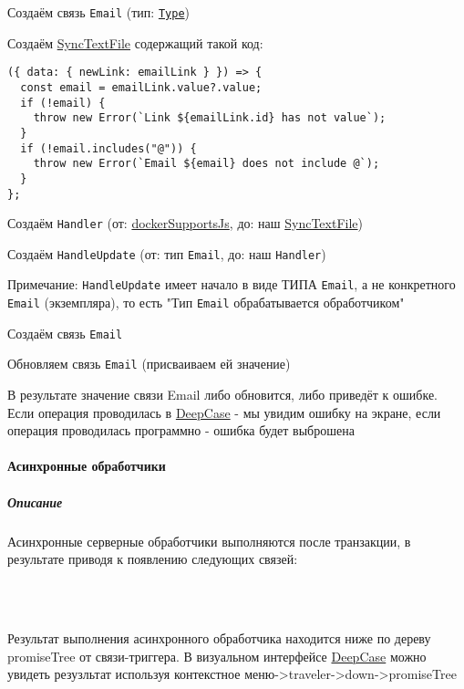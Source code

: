 \documentclass{article}
\begin{document}
Создаём связь \texttt{Email} (тип: \texttt{\hyperlink{Core.Type.Description}{Type}})

Создаём \hyperlink{Core.SyncTextFile.Description}{SyncTextFile} содержащий такой код:

\begin{lstlisting}
({ data: { newLink: emailLink } }) => {
  const email = emailLink.value?.value;
  if (!email) {
    throw new Error(`Link ${emailLink.id} has not value`);
  }
  if (!email.includes("@")) {
    throw new Error(`Email ${email} does not include @`);
  }
};
\end{lstlisting}

Создаём \texttt{Handler} (от:
\hyperlink{Core.dockerSupportsJs.Description}{dockerSupportsJs}, до: наш
\hyperlink{Core.SyncTextFile.Description}{SyncTextFile})

Создаём \texttt{HandleUpdate} (от: тип \texttt{Email}, до: наш
\texttt{Handler})

Примечание: \texttt{HandleUpdate} имеет начало в виде ТИПА \texttt{Email}, а
не конкретного \texttt{Email} (экземпляра), то есть "Тип \texttt{Email}
обрабатывается обработчиком"

Создаём связь \texttt{Email}

Обновляем связь \texttt{Email} (присваиваем ей значение)

В результате значение связи Email либо обновится, либо приведёт к ошибке.
Если операция проводилась в \hyperlink{DeepCase.Description}{DeepCase} - мы увидим
ошибку на экране, если
операция проводилась программно - ошибка будет выброшена

\paragraph{Асинхронные обработчики}
\subparagraph{Описание}
Асинхронные серверные обработчики выполняются после транзакции, в результате
приводя к появлению следующих связей: \\
\newenvironment{handler_success_result_info}
{%
  \noindent При успешном выполнении: Связь\textendash триггер \textendash
  Then\textendash > Promise \textendash Resolved\textendash > \\
  PromiseResult {(с object value)}
}
{}
\newenvironment{handler_fail_result_info}
{%
  При ошибке: Связь\textendash триггер \textendash Then\textendash > Promise
  \textendash Rejected\textendash > PromiseResult {(с object value)}
}
{}
\begin{handler_success_result_info}
\end{handler_success_result_info}\\
\begin{handler_fail_result_info}
\end{handler_fail_result_info}\\
Результат выполнения асинхронного обработчика находится ниже по дереву
promiseTree от связи-триггера. В визуальном интерфейсе
\hyperlink{DeepCase.Description}{DeepCase} можно увидеть
резузльтат используя контекстное меню->traveler->down->promiseTree
\end{document}
